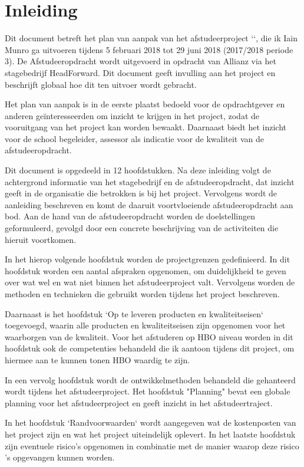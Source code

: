 \chapter{Inleiding}
Dit document betreft het plan van aanpak van het afstudeerproject ‘\thesisTitle‘, die ik Iain Munro ga uitvoeren tijdens 5 februari 2018 tot 29 juni 2018 (2017/2018 periode 3). De Afstudeeropdracht wordt uitgevoerd in opdracht van Allianz via het stagebedrijf HeadForward. Dit document geeft invulling aan het project en beschrijft globaal hoe dit ten uitvoer wordt gebracht.\par

Het plan van aanpak is in de eerste plaatst bedoeld voor de opdrachtgever en anderen geïnteresseerden om inzicht te krijgen in het project, zodat de vooruitgang van het project kan worden bewaakt. Daarnaast biedt het inzicht voor de school begeleider, assessor als indicatie voor de kwaliteit van de afstudeeropdracht.\par

Dit document is opgedeeld in 12 hoofdstukken. Na deze inleiding volgt de achtergrond informatie van het stagebedrijf en de afstudeeropdracht, dat inzicht geeft in de organisatie die betrokken is bij het project. Vervolgens wordt de aanleiding beschreven en komt de daaruit voortvloeiende afstudeeropdracht aan bod. Aan de hand van de afstudeeropdracht worden de doelstellingen geformuleerd, gevolgd door een concrete beschrijving van de activiteiten die hieruit voortkomen.\par

In het hierop volgende hoofdstuk worden de projectgrenzen gedefinieerd. In dit hoofdstuk worden een aantal afspraken opgenomen, om duidelijkheid te geven over wat wel en wat niet binnen het afstudeerproject valt. Vervolgens worden de methoden en technieken die gebruikt worden tijdens het project beschreven.\par

Daarnaast is het hoofdstuk ‘Op te leveren producten en kwaliteitseisen‘  toegevoegd, waarin alle producten en kwaliteitseisen zijn opgenomen voor het waarborgen van de kwaliteit. Voor het afstuderen op HBO niveau worden in dit hoofdstuk ook de competenties behandeld die ik aantoon tijdens dit project, om hiermee aan te kunnen tonen HBO waardig te zijn. \par

In een vervolg hoofdstuk wordt de ontwikkelmethoden behandeld die gehanteerd wordt tijdens het afstudeerproject. Het hoofdstuk "Planning" bevat een globale planning voor het afstudeerproject en geeft inzicht in het afstudeertraject.\par

In het hoofdstuk ‘Randvoorwaarden‘ wordt aangegeven wat de kostenposten van het project zijn en wat het project uiteindelijk oplevert. In het laatste hoofdstuk zijn eventuele risico's opgenomen in combinatie met de manier waarop deze risico 's opgevangen kunnen worden.